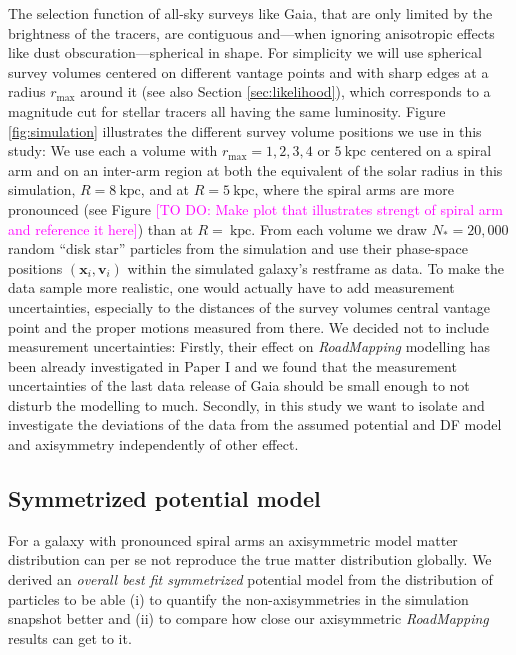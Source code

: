 \documentclass[iop,revtex4,numberedappendix,appendixfloats]{emulateapj}
\newcommand{\vect}[1]{\boldsymbol{#1}}
\newcommand{\RM}{{\sl RoadMapping}}
\newcommand{\Wilma}[1]{\textcolor{Magenta}{#1}}
\begin{document}
The selection function of all-sky surveys like Gaia, that are only limited by the brightness of the tracers, are contiguous and---when ignoring anisotropic effects like dust obscuration---spherical in shape. For simplicity we will use spherical survey volumes centered on different vantage points and with sharp edges at a radius $r_\text{max}$ around it (see also Section \ref{sec:likelihood}), which corresponds to a magnitude cut for stellar tracers all having the same luminosity. Figure \ref{fig:simulation} illustrates the different survey volume positions we use in this study: We use each a volume with $r_\text{max}=1,2,3,4$ or $5~\text{kpc}$ centered on a spiral arm and on an inter-arm region at both the equivalent of the solar radius in this simulation, $R=8~\text{kpc}$, and at $R=5~\text{kpc}$, where the spiral arms are more pronounced (see Figure \Wilma{[TO DO: Make plot that illustrates strengt of spiral arm and reference it here]}) than at $R=~\text{kpc}$. From each volume we draw $N_*=20,000$ random ``disk star'' particles from the simulation and use their phase-space positions $(\vect{x}_i,\vect{v}_i)$ within the simulated galaxy's restframe as data. To make the data sample more realistic, one would actually have to add measurement uncertainties, especially to the distances of the survey volumes central vantage point and the proper motions measured from there. We decided not to include measurement uncertainties: Firstly, their effect on \RM{} modelling has been already investigated in Paper I and we found that the measurement uncertainties of the last data release of Gaia should be small enough to not disturb the modelling to much. Secondly, in this study we want to isolate and investigate the deviations of the data from the assumed potential and DF model and axisymmetry independently of other effect.

\subsection{Symmetrized potential model} \label{sec:DEHH-Pot}

For a galaxy with pronounced spiral arms an axisymmetric model matter distribution can per se not reproduce the true matter distribution globally. We derived an \emph{overall best fit symmetrized} potential model from the distribution of particles to be able (i) to quantify the non-axisymmetries in the simulation snapshot better and (ii) to compare how close our axisymmetric \RM{} results can get to it. 
\end{document}
